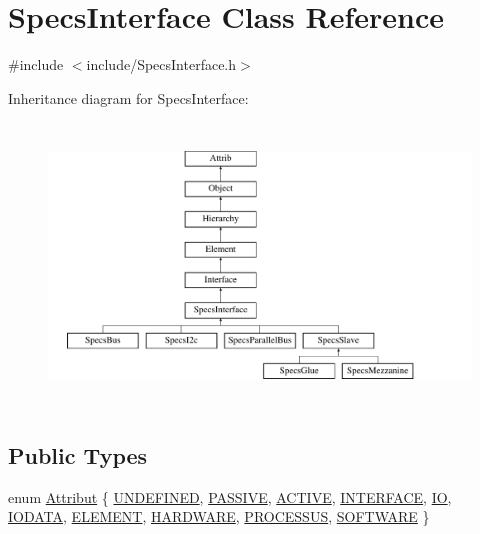 \hypertarget{classSpecsInterface}{}\section{Specs\+Interface Class Reference}
\label{classSpecsInterface}


{\ttfamily \#include $<$include/\+Specs\+Interface.\+h$>$}

Inheritance diagram for Specs\+Interface\+:\begin{figure}[H]
\begin{center}
\leavevmode
\includegraphics[height=7.529412cm]{classSpecsInterface}
\end{center}
\end{figure}
\subsection*{Public Types}
\begin{DoxyCompactItemize}
\item 
enum \hyperlink{classAttrib_a69e171d7cc6417835a5a306d3c764235}{Attribut} \{ \newline
\hyperlink{classAttrib_a69e171d7cc6417835a5a306d3c764235a3a8da2ab97dda18aebab196fe4100531}{U\+N\+D\+E\+F\+I\+N\+ED}, 
\hyperlink{classAttrib_a69e171d7cc6417835a5a306d3c764235a2bfb2af57b87031d190a05fe25dd92ed}{P\+A\+S\+S\+I\+VE}, 
\hyperlink{classAttrib_a69e171d7cc6417835a5a306d3c764235a3b1fec929c0370d1436f2f06e298fb0d}{A\+C\+T\+I\+VE}, 
\hyperlink{classAttrib_a69e171d7cc6417835a5a306d3c764235aa27c16b480a369ea4d18b07b2516bbc7}{I\+N\+T\+E\+R\+F\+A\+CE}, 
\newline
\hyperlink{classAttrib_a69e171d7cc6417835a5a306d3c764235a1420a5b8c0540b2af210b6975eded7f9}{IO}, 
\hyperlink{classAttrib_a69e171d7cc6417835a5a306d3c764235a0af3b0d0ac323c1704e6c69cf90add28}{I\+O\+D\+A\+TA}, 
\hyperlink{classAttrib_a69e171d7cc6417835a5a306d3c764235a7788bc5dd333fd8ce18562b269c9dab1}{E\+L\+E\+M\+E\+NT}, 
\hyperlink{classAttrib_a69e171d7cc6417835a5a306d3c764235a61ceb22149f365f1780d18f9d1459423}{H\+A\+R\+D\+W\+A\+RE}, 
\newline
\hyperlink{classAttrib_a69e171d7cc6417835a5a306d3c764235a75250e29692496e73effca2c0330977f}{P\+R\+O\+C\+E\+S\+S\+US}, 
\hyperlink{classAttrib_a69e171d7cc6417835a5a306d3c764235a103a67cd0b8f07ef478fa45d4356e27b}{S\+O\+F\+T\+W\+A\+RE}
 \}
\end{DoxyCompactItemize}
